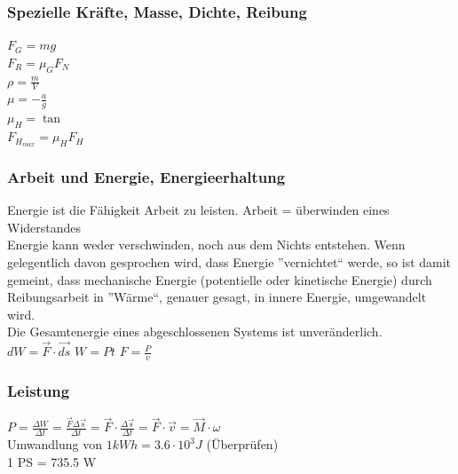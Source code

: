 \subsubsection{Spezielle Kräfte, Masse, Dichte, Reibung}
$F_{G} = mg$ \\
$F_{R} = \mu_{G}F_{N}$ \\
$\rho = \frac{m}{V}$ \\
$\mu = - \frac{a}{g}$ \\
$\mu_{H} = \tan{}$ \\
$F_{H_{max}} = \mu_{H}F_{H}$ \\ 

\subsubsection{Arbeit und Energie, Energieerhaltung}
Energie ist die Fähigkeit Arbeit zu leisten. Arbeit = überwinden eines Widerstandes \\
Energie kann weder verschwinden, noch aus dem Nichts entstehen. 
Wenn gelegentlich davon gesprochen wird, dass Energie 
”vernichtet“ werde, so ist damit gemeint, dass mechanische Energie 
(potentielle oder kinetische Energie) durch Reibungsarbeit in 
”Wärme“, genauer gesagt, in innere Energie, umgewandelt wird. \\
Die Gesamtenergie eines abgeschlossenen Systems ist 
unveränderlich. \\
$dW = \overrightarrow{F} \cdot \overrightarrow{ds}$
$W = Pt$
$F = \frac{P}{v}$

\subsubsection{Leistung}

$P = \frac{\Delta W}{\Delta t} = \frac{\overrightarrow{F} \Delta \overrightarrow{s}}{ \Delta t} = \overrightarrow{F} \cdot \frac{\Delta \overrightarrow{s}}{\Delta t} = \overrightarrow{F} \cdot \overrightarrow{v} = \overrightarrow{M} \cdot \omega$ \\
Umwandlung von $1 kWh = 3.6 \cdot 10^3 J $ (Überprüfen) \\
1 PS = 735.5 W


